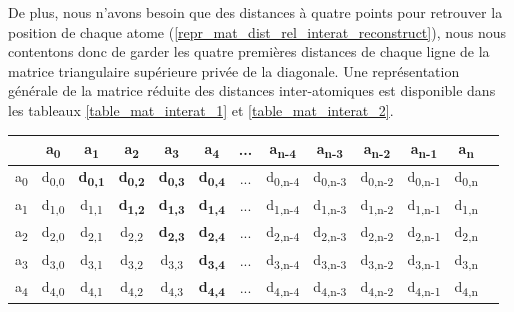 \par De plus, nous n'avons besoin que des distances à quatre points pour retrouver la position de chaque atome (\ref{repr_mat_dist_rel_interat_reconstruct}), nous nous contentons donc de garder les quatre premières distances de chaque ligne de la matrice triangulaire supérieure privée de la diagonale. Une représentation générale de la matrice réduite des distances inter-atomiques est disponible dans les tableaux \ref{table_mat_interat_1} et \ref{table_mat_interat_2}.


\begin{table}
	\centering
	
	
	\begin{tabular}{c|c|c|c|c|c|c|c|c|c|c|c|c}
	    & a\textsubscript{0} & a\textsubscript{1} & a\textsubscript{2} & a\textsubscript{3} & a\textsubscript{4} & ... & a\textsubscript{n-4} & a\textsubscript{n-3} & a\textsubscript{n-2} & 
	    	 a\textsubscript{n-1}  & a\textsubscript{n}\\ \hline
		a\textsubscript{0} & d\textsubscript{0,0} & \textbf{d\textsubscript{0,1}} & \textbf{d\textsubscript{0,2}} & 
		    \textbf{d\textsubscript{0,3}} & \textbf{d\textsubscript{0,4}} & ... & d\textsubscript{0,n-4} & 
		    d\textsubscript{0,n-3} & d\textsubscript{0,n-2} & d\textsubscript{0,n-1}
		    & d\textsubscript{0,n} \\ \hline
		a\textsubscript{1} & d\textsubscript{1,0} & d\textsubscript{1,1} & \textbf{d\textsubscript{1,2}} & 
			\textbf{d\textsubscript{1,3}} & \textbf{d\textsubscript{1,4}} & ... & d\textsubscript{1,n-4} & 
			d\textsubscript{1,n-3} & d\textsubscript{1,n-2} & d\textsubscript{1,n-1} & 
			d\textsubscript{1,n} \\ \hline
		a\textsubscript{2} & d\textsubscript{2,0} & d\textsubscript{2,1} & d\textsubscript{2,2} &
			\textbf{d\textsubscript{2,3}} & \textbf{d\textsubscript{2,4}} & ... & d\textsubscript{2,n-4} & 
			d\textsubscript{2,n-3} & d\textsubscript{2,n-2} & d\textsubscript{2,n-1} & 
			d\textsubscript{2,n} \\ \hline
		a\textsubscript{3} & d\textsubscript{3,0} & d\textsubscript{3,1} & d\textsubscript{3,2} & 
			d\textsubscript{3,3} & \textbf{d\textsubscript{3,4}} & ... & d\textsubscript{3,n-4} & 
			d\textsubscript{3,n-3} & d\textsubscript{3,n-2} & d\textsubscript{3,n-1} & 
			d\textsubscript{3,n} \\ \hline
			
		a\textsubscript{4} & d\textsubscript{4,0} & d\textsubscript{4,1} & d\textsubscript{4,2} & 
			d\textsubscript{4,3} & \textbf{d\textsubscript{4,4}} & ... & d\textsubscript{4,n-4} & 
			d\textsubscript{4,n-3} & d\textsubscript{4,n-2} & d\textsubscript{4,n-1} & 
			d\textsubscript{4,n} \\ \hline
			

\end{tabular}
\end{table}
